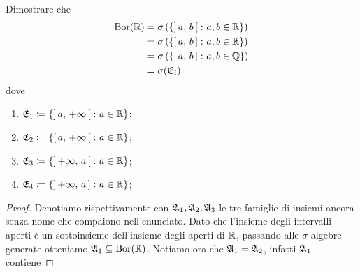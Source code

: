 \documentclass[../EserciziIstituzioniAnalisi.tex]{subfiles}
\begin{document}
\begin{exercise}[2016-10-10-1]
  Dimostrare che
  \begin{subequations}
    \begin{align}    
      \operatorname{Bor} (\mathbb R) & = \sigma \left(\left\{ \left]\,a,\,b\,\right[ \colon a, b \in \mathbb R \right\} \right) \\
      & = \sigma \left(\left\{\left[\,a,\,b\,\right] \colon a, b \in \mathbb R \right\}\right) \\
      & = \sigma \left(\left\{\left]\,a,\,b\,\right] \colon a, b \in \mathbb Q \right\}\right) \\
      & = \sigma (\mathfrak E_i)
    \end{align}
  \end{subequations}
  dove
  \begin{enumerate}
    \item $\mathfrak E_{1}\coloneqq \{\left]\,a,\,+\infty\,\right[ \colon a \in \mathbb R\}$;
    \item $\mathfrak E_{2}\coloneqq \{\left[\,a,\,+\infty\,\right[ \colon a \in \mathbb R\}$;
    \item $\mathfrak E_{3}\coloneqq \{\left]\,+\infty,\,a\,\right[ \colon a \in \mathbb R\}$;
    \item $\mathfrak E_{4}\coloneqq \{\left]\,+\infty,\,a\,\right] \colon a \in \mathbb R\}$;
  \end{enumerate}
\end{exercise}
\begin{proof}
  Denotiamo rispettivamente con $\mathfrak A_1, \mathfrak A_2, \mathfrak A_3$ le tre famiglie di insiemi ancora senza nome che compaiono nell'enunciato.
  Dato che l'insieme degli intervalli aperti è un sottoinsieme dell'insieme degli aperti di $\mathbb R$, passando alle $\sigma$-algebre generate otteniamo $\mathfrak A_1 \subseteq \operatorname{Bor} (\mathbb R)$.
  Notiamo ora che $\mathfrak A_1 = \mathfrak A_2$, infatti $\mathfrak A_1$ contiene 
\end{proof}
\end{document}
